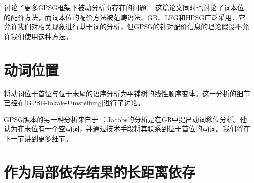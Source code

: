  \citet[--396]{Jacobson87b}讨论了更多GPSG框架下被动分析所存在的问题，
这篇论文同时也讨论了词本位的配价方法，而词本位的配价方法被范畴语法、GB、LFG和HPSG广泛采用，它允许我们对相关现象进行基于词的分析，但GPSG的针对配价信息的理论假设不允许我们使用这种方法。

\section{动词位置}
\label{Abschnitt-Verbstellung-GPSG}

\mbox{} \citet{Uszkoreit87a}将动词位于首位与位于末尾的语序分析为平铺树的线性顺序变体。这一分析的细节已经在\ref{GPSG-lokale-Umstellung}进行了讨论。

GPSG版本的另一种分析来自于 \citet[]{Jacobs86a}：Jacobs的分析是在GB中提出动词移位分析。他认为在末位有一个空动词，并通过技术手段将其联系到位于首位的动词。我们将在下一节讲到更多细节。

\section{作为局部依存结果的长距离依存}
\label{Abschnitt-GPSG-Fernabhaengigkeiten}\label{sec-nld-gpsg}


